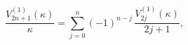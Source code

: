 \begin{equation*}
\frac{V_{2n+1}^{(1)}(\kappa)}{\kappa}=\sum_{j=0}^{n}
(-1)^{n-j}\,\frac{V_{2j}^{(1)}(\kappa)}{2j+1},
\end{equation*}

